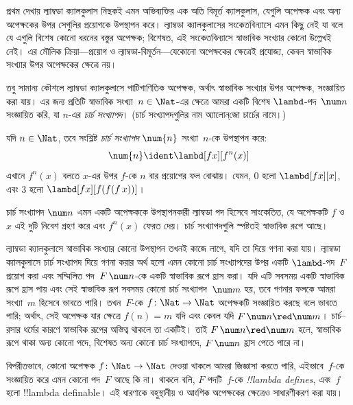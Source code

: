 \documentclass[../../../include/open-logic-section]{subfiles}
\begin{document}

প্রথম দেখায় ল্যাম্বডা ক্যালকুলাস নিছকই এমন অভিব্যক্তির এক অতি বিমূর্ত
ক্যালকুলাস, যেগুলি অপেক্ষক এবং অন্য অপেক্ষকের উপর সেগুলির প্রয়োগকে
উপস্থাপন করে। ল্যাম্বডা ক্যালকুলাসের সংকেতবিন্যাসে এমন কিছু নেই যা বলে
যে এগুলি বিশেষ কোনো ধরনের বস্তুর অপেক্ষক; বিশেষত, এই সংকেতবিন্যাসে
স্বাভাবিক সংখ্যার কোনো উল্লেখই নেই। এর মৌলিক ক্রিয়া---প্রয়োগ ও
ল্যাম্বডা-বিমূর্তন---যেকোনো অপেক্ষকের ক্ষেত্রেই প্রযোজ্য, কেবল স্বাভাবিক
সংখ্যার উপর অপেক্ষকের ক্ষেত্রে নয়।

তবু সামান্য কৌশলে ল্যাম্বডা ক্যালকুলাসে পাটিগাণিতিক অপেক্ষক, অর্থাৎ
স্বাভাবিক সংখ্যার উপর অপেক্ষক, সংজ্ঞায়িত করা যায়। এর জন্য প্রতিটি
স্বাভাবিক সংখ্যা~$n \in \Nat$-এর ক্ষেত্রে আমরা একটি বিশেষ
$\lambd$-পদ~$\num n$ সংজ্ঞায়িত করি, যা $n$-এর \emph{চার্চ সংখ্যাপদ}।
(চার্চ সংখ্যাপদগুলির নাম অ্যালোন্‌জো চার্চের নামে।)

\begin{defn}
  যদি $n \in \Nat$, তবে সংশ্লিষ্ট \emph{চার্চ সংখ্যাপদ} $\num{n}$
  সংখ্যা~$n$-কে উপস্থাপন করে:
  \[
    \num{n} \ident \lambd[fx][f^n(x)]
  \]
  এখানে $f^n(x)$ বলতে $x$-এর উপর $f$-কে $n$ বার প্রয়োগের ফল বোঝায়।
  যেমন, $\num{0}$ হলো $\lambd[fx][x]$, এবং $\num{3}$ হলো
  $\lambd[fx][f(f(f\,x))]$।
\end{defn}

চার্চ সংখ্যাপদ $\num n$ এমন একটি অপেক্ষককে উপস্থাপনকারী ল্যাম্বডা পদ
হিসেবে সাংকেতিত, যে অপেক্ষকটি $f$ ও~$x$ এই দুটি নিবেশ গ্রহণ করে এবং
$f^n(x)$ ফেরত দেয়। চার্চ সংখ্যাপদগুলি স্পষ্টতই স্বাভাবিক রূপে আছে।

ল্যাম্বডা ক্যালকুলাসে স্বাভাবিক সংখ্যার কোনো উপস্থাপন তখনই কাজে লাগে,
যদি তা দিয়ে গণনা করা যায়। ল্যাম্বডা ক্যালকুলাসে চার্চ সংখ্যাপদ দিয়ে
গণনা করার অর্থ হলো এমন কোনো চার্চ সংখ্যাপদের উপর একটি $\lambd$-পদ~$F$
প্রয়োগ করা এবং সম্মিলিত পদ~$F\, \num n$-কে একটি স্বাভাবিক রূপে হ্রাস
করা। যদি এটি সবসময় একটি স্বাভাবিক রূপে হ্রাস পায় এবং সেই স্বাভাবিক রূপ
সবসময় কোনো চার্চ সংখ্যাপদ~$\num m$ হয়, তবে গণনার ফলকে আমরা সংখ্যা~$m$
হিসেবে ভাবতে পারি। তখন~$F$-কে $f\colon \Nat \to \Nat$ অপেক্ষকটি
সংজ্ঞায়িত করছে বলে ভাবতে পারি; অর্থাৎ, সেই অপেক্ষক যার ক্ষেত্রে
$f(n) = m$ যদি এবং কেবল যদি $F\, \num n \red \num m$। চার্চ--রসার ধর্মের
কারণে স্বাভাবিক রূপের অস্তিত্ব থাকলে তা একটিই। তাই
$F\, \num n \red \num m$ হলে, স্বাভাবিক রূপে থাকা অন্য কোনো পদে,
বিশেষত অন্য কোনো চার্চ সংখ্যাপদে, $F \, \num n$ হ্রাস পেতে পারে না।

বিপরীতভাবে, কোনো অপেক্ষক $f\colon \Nat \to \Nat$ দেওয়া থাকলে আমরা
জিজ্ঞাসা করতে পারি, এইভাবে~$f$-কে সংজ্ঞায়িত করে এমন কোনো পদ~$F$ আছে
কি না। থাকলে বলি, $F$ পদটি~$f$-কে \emph{!!{lambda define}s}, এবং~$f$
হলো !!{lambda definable}। এই ধারণাকে বহুস্থানীয় ও আংশিক অপেক্ষকের
ক্ষেত্রেও সাধারণীকরণ করা যায়।
\end{document}
